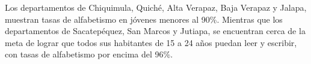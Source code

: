 Los departamentos de Chiquimula, Quiché, Alta Verapaz, Baja Verapaz y Jalapa, muestran tasas de alfabetismo en jóvenes menores al 90\%. Mientras que los departamentos de Sacatepéquez, San Marcos y Jutiapa, se encuentran cerca de la meta de lograr que todos sus habitantes de 15 a 24 años puedan leer y escribir, con tasas de alfabetismo por encima del 96\%.
